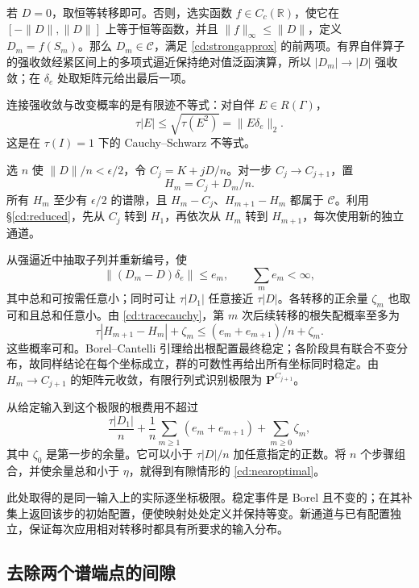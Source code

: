 \documentclass[UTF8,zihao=-4,a4paper]{ctexart}
\numberwithin{equation}{section}
\begin{document}
若 $D=0$，取恒等转移即可。否则，选实函数 $f\in C_c(\mathbb R)$，使它在 $[-\|D\|,\|D\|]$ 上等于恒等函数，并且 $\|f\|_\infty\le\|D\|$，定义 $D_m=f(S_m)$。那么 $D_m\in\mathcal C$，满足 \eqref{cd:strongapprox} 的前两项。有界自伴算子的强收敛经紧区间上的多项式逼近保持绝对值泛函演算，所以 $|D_m|\to|D|$ 强收敛；在 $\delta_e$ 处取矩阵元给出最后一项。

连接强收敛与改变概率的是有限迹不等式：对自伴 $E\in R(\Gamma)$，
\begin{equation}
\tau|E|\le\sqrt{\tau(E^2)}=\|E\delta_e\|_2.
\label{cd:tracecauchy}
\end{equation}
这是在 $\tau(I)=1$ 下的 Cauchy--Schwarz 不等式。

选 $n$ 使 $\|D\|/n<\epsilon/2$，令 $C_j=K+jD/n$。对一步
$C_j\to C_{j+1}$，置
\[
H_m=C_j+D_m/n.
\]
所有 $H_m$ 至少有 $\epsilon/2$ 的谱隙，且 $H_m-C_j$、$H_{m+1}-H_m$ 都属于 $\mathcal C$。利用 \S\ref{cd:reduced}，先从 $C_j$ 转到 $H_1$，再依次从 $H_m$ 转到 $H_{m+1}$，每次使用新的独立通道。

从强逼近中抽取子列并重新编号，使
\[
\|(D_m-D)\delta_e\|\le e_m,
\qquad \sum_m e_m<\infty,
\]
其中总和可按需任意小；同时可让 $\tau|D_1|$ 任意接近 $\tau|D|$。各转移的正余量 $\zeta_m$ 也取可和且总和任意小。由 \eqref{cd:tracecauchy}，第 $m$ 次后续转移的根失配概率至多为
\begin{equation}
\tau|H_{m+1}-H_m|+\zeta_m
\le(e_m+e_{m+1})/n+\zeta_m.
\label{cd:summablecost}
\end{equation}
这些概率可和。Borel--Cantelli 引理给出根配置最终稳定；各阶段具有联合不变分布，故同样结论在每个坐标成立，群的可数性再给出所有坐标同时稳定。由 $H_m\to C_{j+1}$ 的矩阵元收敛，有限行列式识别极限为 $\mathbf P^{C_{j+1}}$。

从给定输入到这个极限的根费用不超过
\begin{equation}
\frac{\tau|D_1|}{n}
+\frac1n\sum_{m\ge1}(e_m+e_{m+1})
+\sum_{m\ge0}\zeta_m,
\label{cd:onestepcost}
\end{equation}
其中 $\zeta_0$ 是第一步的余量。它可以小于 $\tau|D|/n$ 加任意指定的正数。将 $n$ 个步骤组合，并使余量总和小于 $\eta$，就得到有隙情形的 \eqref{cd:nearoptimal}。

此处取得的是同一输入上的实际逐坐标极限。稳定事件是 Borel 且不变的；在其补集上返回该步的初始配置，便使映射处处定义并保持等变。新通道与已有配置独立，保证每次应用相对转移时都具有所要求的输入分布。

\subsection{去除两个谱端点的间隙}\label{cd:endpoints}
\end{document}

